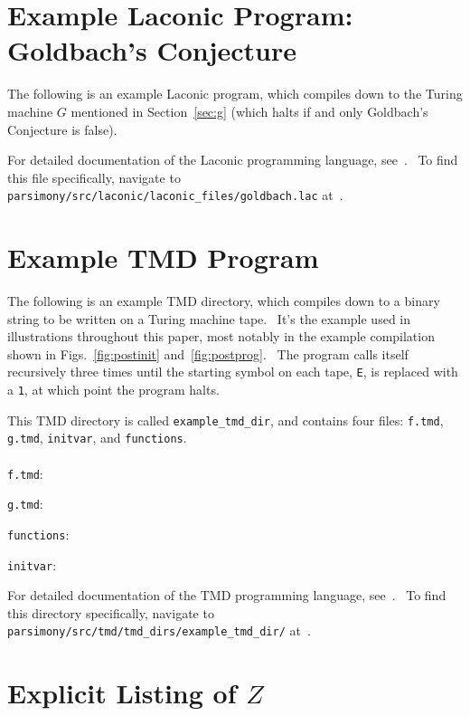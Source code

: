 \documentclass[11pt]{article}
\begin{document}
\begin{appendices}

\section{Example Laconic Program: Goldbach's Conjecture} \label{sec:applac}

The following is an example Laconic program, which compiles down to the Turing machine $G$ mentioned in Section~\ref{sec:g} (which halts if and only Goldbach's Conjecture is false).



For detailed documentation of the Laconic programming language, see~\cite{github}. \ To find this file specifically, navigate to \texttt{parsimony/src/laconic/laconic\_files/goldbach.lac} at~\cite{github}.

\section{Example TMD Program} \label{sec:apptmd}

The following is an example TMD directory, which compiles down to a binary string to be written on a Turing machine tape. \ It's the example used in illustrations throughout this paper, most notably in the example compilation shown in Figs.~\ref{fig:postinit} and~\ref{fig:postprog}. \ The program calls itself recursively three times until the starting symbol on each tape, \texttt{E}, is replaced with a \texttt{1}, at which point the program halts.

This TMD directory is called \texttt{example\_tmd\_dir}, and contains four files: \texttt{f.tmd}, \texttt{g.tmd}, \texttt{initvar}, and \texttt{functions}. \\ \\

\texttt{f.tmd}:

\texttt{g.tmd}:

\texttt{functions}:

\texttt{initvar}:


For detailed documentation of the TMD programming language, see~\cite{github}. \ To find this directory specifically, navigate to \texttt{parsimony/src/tmd/tmd\_dirs/example\_tmd\_dir/} at~\cite{github}.

\section{Explicit Listing of $Z$} \label{sec:explicitz}


\end{appendices}
\end{document}
